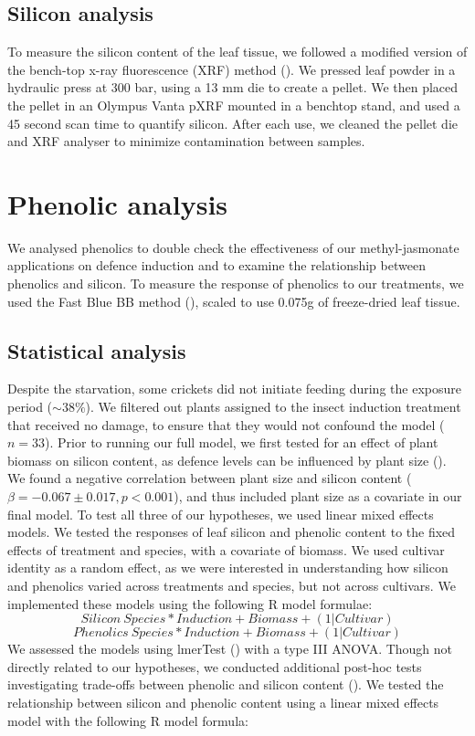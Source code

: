 \documentclass[12pt, letterpaper]{report}
\begin{document}
\subsection{Silicon analysis}

To measure the silicon content of the leaf tissue, we followed a modified version of the bench-top x-ray fluorescence (XRF) method (\cite{reidinger_rapid_2012}). We pressed leaf powder in a hydraulic press at 300 bar, using a 13 mm die to create a pellet. We then placed the pellet in an Olympus Vanta pXRF mounted in a benchtop stand, and used a 45 second scan time to quantify silicon. After each use, we cleaned the pellet die and XRF analyser to minimize contamination between samples.

\section{Phenolic analysis}

We analysed phenolics to double check the effectiveness of our methyl-jasmonate applications on defence induction and to examine the relationship between phenolics and silicon. To measure the response of phenolics to our treatments, we used the Fast Blue BB method (\cite{pico2020systematic}), scaled to use 0.075g of freeze-dried leaf tissue.  

\subsection{Statistical analysis}

Despite the starvation, some crickets did not initiate feeding during the exposure period ($\sim38\%$). We filtered out plants assigned to the insect induction treatment that received no damage, to ensure that they would not confound the model ($n = 33$). Prior to running our full model, we first tested for an effect of plant biomass on silicon content, as defence levels can be influenced by plant size (\cite{carmona_plant_2011}). We found a negative correlation between plant size and silicon content ($\beta = -0.067 \pm 0.017, p < 0.001$), and thus included plant size as a covariate in our final model. To test all three of our hypotheses, we used linear mixed effects models. We tested the responses of leaf silicon and phenolic content to the fixed effects of treatment and species, with a covariate of biomass. We used cultivar identity as a random effect, as we were interested in understanding how silicon and phenolics varied across treatments and species, but not across cultivars. We implemented these models using the following R model formulae:
\[Silicon ~ Species * Induction + Biomass + (1|Cultivar)\]
\[Phenolics ~ Species * Induction + Biomass + (1|Cultivar)\]
We assessed the models using lmerTest (\cite{kuznetsova_2017_lmerTest}) with a type III ANOVA. 
Though not directly related to our hypotheses, we conducted additional post-hoc tests investigating trade-offs between phenolic and silicon content (\cite{simpson_still_2017,waterman_short-term_2021}). We tested the relationship between silicon and phenolic content using a linear mixed effects model with the following R model formula:
\end{document}

